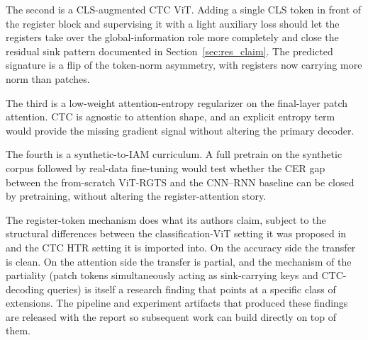 The second is a CLS-augmented CTC ViT. Adding a single CLS token in front of the register block and supervising it with a light auxiliary loss should let the registers take over the global-information role more completely and close the residual sink pattern documented in Section~\ref{sec:res_claim}. The predicted signature is a flip of the token-norm asymmetry, with registers now carrying more norm than patches.

The third is a low-weight attention-entropy regularizer on the final-layer patch attention. CTC is agnostic to attention shape, and an explicit entropy term would provide the missing gradient signal without altering the primary decoder.

The fourth is a synthetic-to-IAM curriculum. A full pretrain on the synthetic corpus followed by real-data fine-tuning would test whether the CER gap between the from-scratch ViT-RGTS and the CNN--RNN baseline can be closed by pretraining, without altering the register-attention story.

The register-token mechanism does what its authors claim, subject to the structural differences between the classification-ViT setting it was proposed in and the CTC HTR setting it is imported into. On the accuracy side the transfer is clean. On the attention side the transfer is partial, and the mechanism of the partiality (patch tokens simultaneously acting as sink-carrying keys and CTC-decoding queries) is itself a research finding that points at a specific class of extensions. The pipeline and experiment artifacts that produced these findings are released with the report so subsequent work can build directly on top of them.
